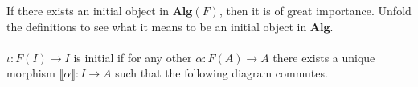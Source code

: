 \documentclass[11pt,a4paper]{article}
\newcommand{\gr}{\textbf}
\newcommand{\lb}{\llbracket}
\newcommand{\rb}{\rrbracket}
\newcommand{\1}{\mathbbm{1}}
\begin{document}
If there exists an initial object in $\gr{Alg}(F)$, then it is of great importance. Unfold the definitions to see what it means to be an initial object in $\gr{Alg}$.\\\\
$\iota : F(I) \to I$ is initial if for any other $\alpha : F(A) \to A$ there exists a unique morphism $\lb \alpha \rb : I \to A$ such that the following diagram commutes.
\begin{center}
\end{center} 
\newpage
\end{document}
